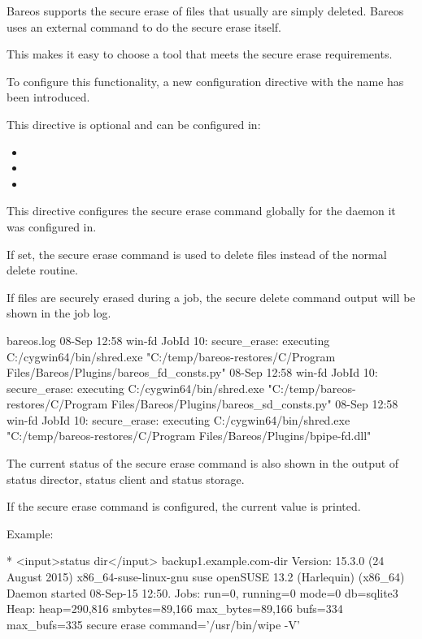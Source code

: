 Bareos supports the secure erase of files that usually are simply deleted.
Bareos uses an external command to do the secure erase itself.

This makes it easy to choose a tool that meets the secure erase requirements.


To configure this functionality, a new configuration directive with the name 
 has been introduced.

This directive is optional and can be configured in:

\begin{itemize}
  \item {}
  \item {}
  \item {}
\end{itemize}

This directive configures the secure erase command globally for the daemon it was configured in.

If set, the secure erase command is used to delete files instead of the normal delete routine.

If files are securely erased during a job, the secure delete command output will be shown in the job log.

\begin{logging}{bareos.log}
08-Sep 12:58 win-fd JobId 10: secure_erase: executing C:/cygwin64/bin/shred.exe "C:/temp/bareos-restores/C/Program Files/Bareos/Plugins/bareos_fd_consts.py"
08-Sep 12:58 win-fd JobId 10: secure_erase: executing C:/cygwin64/bin/shred.exe "C:/temp/bareos-restores/C/Program Files/Bareos/Plugins/bareos_sd_consts.py"
08-Sep 12:58 win-fd JobId 10: secure_erase: executing C:/cygwin64/bin/shred.exe "C:/temp/bareos-restores/C/Program Files/Bareos/Plugins/bpipe-fd.dll"
\end{logging}

The current status of the secure erase command is also shown in the output of status director, status client and status storage.

If the secure erase command is configured, the current value is printed.

Example:
\begin{bconsole}{}
* <input>status dir</input>
backup1.example.com-dir Version: 15.3.0 (24 August 2015) x86_64-suse-linux-gnu suse openSUSE 13.2 (Harlequin) (x86_64)
Daemon started 08-Sep-15 12:50. Jobs: run=0, running=0 mode=0 db=sqlite3
 Heap: heap=290,816 smbytes=89,166 max_bytes=89,166 bufs=334 max_bufs=335
 secure erase command='/usr/bin/wipe -V'
\end{bconsole}

